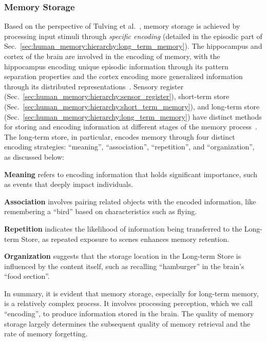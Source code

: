 \documentclass[journal,hideappendix]{vgtc}
\newenvironment{j_itemize}{
\begin{itemize}[]
  \setlength{\itemsep}{3pt}
  \setlength{\parskip}{0pt}
  \setlength{\parsep}{0pt}
}{\end{itemize}}
\begin{document}
\subsubsection{Memory Storage}
\label{sec:human_memory:processing:storage}

Based on the perspective of Tulving et al.~\cite{tulving1973encoding}, memory storage is achieved by processing input stimuli through \textit{specific encoding} (detailed in the episodic part of Sec.~\ref{sec:human_memory:hierarchy:long_term_memory}).
The hippocampus and cortex of the brain are involved in the encoding of memory, with the hippocampus encoding unique episodic information through its pattern separation properties and the cortex encoding more generalized information through its distributed representations~\cite{marr1991simple,o1994hippocampal,winocur2010memory,o2014complementary}.
Sensory register (Sec.~\ref{sec:human_memory:hierarchy:sensor_register}), short-term store (Sec.~\ref{sec:human_memory:hierarchy:short_term_memory}), and long-term store (Sec.~\ref{sec:human_memory:hierarchy:long_term_memory}) have distinct methods for storing and encoding information at different stages of the memory process~\cite{shiffrin1969memory}. 
The long-term store, in particular, encodes memory through four distinct encoding strategies: ``meaning'', ``association'', ``repetition'', and ``organization'', as discussed below:
\begin{j_itemize}
    \item[$\bullet$] \textbf{Meaning} refers to encoding information that holds significant importance, such as events that deeply impact individuals.
    \item[$\bullet$] \textbf{Association} involves pairing related objects with the encoded information, like remembering a ``bird'' based on characteristics such as flying.
    \item[$\bullet$] \textbf{Repetition} indicates the likelihood of information being transferred to the Long-term Store, as repeated exposure to scenes enhances memory retention.
    \item[$\bullet$] \textbf{Organization} suggests that the storage location in the Long-term Store is influenced by the content itself, such as recalling ``hamburger'' in the brain's ``food section''.
\end{j_itemize}

In summary, it is evident that memory storage, especially for long-term memory, is a relatively complex process. It involves processing perception, which we call ``encoding'', to produce information stored in the brain. The quality of memory storage largely determines the subsequent quality of memory retrieval and the rate of memory forgetting.
\end{document}
